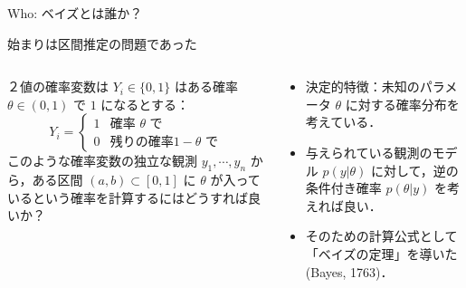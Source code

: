 \documentclass[
  ignorenonframetext,
]{beamer}
\providecommand{\tightlist}{%
  \setlength{\itemsep}{0pt}\setlength{\parskip}{0pt}}\usepackage{longtable,booktabs,array}
\begin{document}
\begin{frame}{Who: ベイズとは誰か？}
\label{who-ux30d9ux30a4ux30baux3068ux306fux8ab0ux304b}
\begin{block}{始まりは区間推定の問題であった}
\label{ux59cbux307eux308aux306fux533aux9593ux63a8ux5b9aux306eux554fux984cux3067ux3042ux3063ux305f}
\begin{columns}[T]
\begin{column}{0.5\textwidth}
\begin{tcolorbox}[enhanced jigsaw, breakable, colback=white, title={ベイズが取り組んだ問題（現代語訳）\footnote{{[}@Bayes1763{]}}}, toptitle=1mm, toprule=.15mm, colbacktitle=quarto-callout-tip-color!10!white, coltitle=black, left=2mm, opacitybacktitle=0.6, colframe=quarto-callout-tip-color-frame, titlerule=0mm, bottomrule=.15mm, bottomtitle=1mm, arc=.35mm, leftrule=.75mm, rightrule=.15mm, opacityback=0]

２値の確率変数は \(Y_i\in\{0,1\}\) はある確率 \(\theta\in(0,1)\) で
\(1\) になるとする： \[
Y_i=\begin{cases}
1&\text{確率 }\theta\text{ で}\\
0&\text{残りの確率} 1-\theta\text{ で}
\end{cases}
\] このような確率変数の独立な観測 \(y_1,\cdots,y_n\) から，ある区間
\((a,b)\subset[0,1]\) に \(\theta\)
が入っているという確率を計算するにはどうすれば良いか？

\end{tcolorbox}
\end{column}

\begin{column}{0.5\textwidth}
\begin{itemize}
\tightlist
\item
  決定的特徴：未知のパラメータ \(\theta\) に対する確率分布を考えている．
\item
  与えられている観測のモデル \(p(y|\theta)\) に対して，逆の条件付き確率
  \(p(\theta|y)\) を考えれば良い．
\item
  そのための計算公式として「ベイズの定理」を導いた (Bayes, 1763)．
\end{itemize}
\end{column}
\end{columns}
\end{block}
\end{frame}
\end{document}
